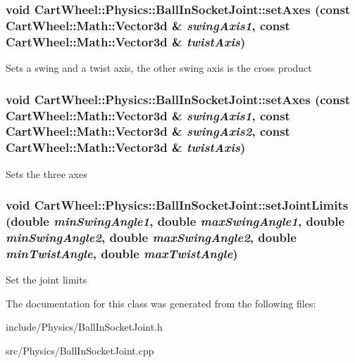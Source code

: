 \hypertarget{classCartWheel_1_1Physics_1_1BallInSocketJoint_af240d9745050209ff29d407678c59930}{
\subsubsection[{setAxes}]{\setlength{\rightskip}{0pt plus 5cm}void CartWheel::Physics::BallInSocketJoint::setAxes (const {\bf CartWheel::Math::Vector3d} \& {\em swingAxis1}, \/  const {\bf CartWheel::Math::Vector3d} \& {\em twistAxis})}}
\label{classCartWheel_1_1Physics_1_1BallInSocketJoint_af240d9745050209ff29d407678c59930}
Sets a swing and a twist axis, the other swing axis is the cross product \hypertarget{classCartWheel_1_1Physics_1_1BallInSocketJoint_a3b1ee8f3e4e5e4ebfd3723c538c0a714}{
\subsubsection[{setAxes}]{\setlength{\rightskip}{0pt plus 5cm}void CartWheel::Physics::BallInSocketJoint::setAxes (const {\bf CartWheel::Math::Vector3d} \& {\em swingAxis1}, \/  const {\bf CartWheel::Math::Vector3d} \& {\em swingAxis2}, \/  const {\bf CartWheel::Math::Vector3d} \& {\em twistAxis})}}
\label{classCartWheel_1_1Physics_1_1BallInSocketJoint_a3b1ee8f3e4e5e4ebfd3723c538c0a714}
Sets the three axes \hypertarget{classCartWheel_1_1Physics_1_1BallInSocketJoint_a15f62913ee27eca01320ea131edf5afe}{
\subsubsection[{setJointLimits}]{\setlength{\rightskip}{0pt plus 5cm}void CartWheel::Physics::BallInSocketJoint::setJointLimits (double {\em minSwingAngle1}, \/  double {\em maxSwingAngle1}, \/  double {\em minSwingAngle2}, \/  double {\em maxSwingAngle2}, \/  double {\em minTwistAngle}, \/  double {\em maxTwistAngle})}}
\label{classCartWheel_1_1Physics_1_1BallInSocketJoint_a15f62913ee27eca01320ea131edf5afe}
Set the joint limits 

The documentation for this class was generated from the following files:\begin{DoxyCompactItemize}
\item 
include/Physics/BallInSocketJoint.h\item 
src/Physics/BallInSocketJoint.cpp\end{DoxyCompactItemize}
